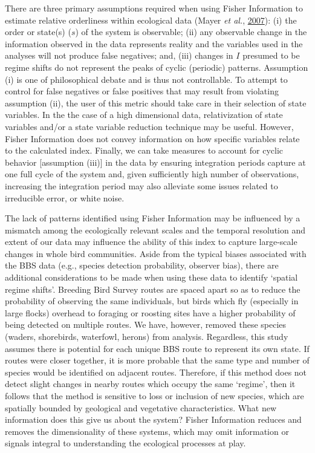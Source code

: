 \documentclass[print]{nuthesis}
\begin{document}
There are three primary assumptions required when using Fisher Information to estimate relative orderliness within ecological data (Mayer \emph{et al.}, \protect\hyperlink{ref-mayer_applications_2007}{2007}): (i) the order or state(s) (\(s\)) of the system is observable; (ii) any observable change in the information observed in the data represents reality and the variables used in the analyses will not produce false negatives; and, (iii) changes in \(I\) presumed to be regime shifts do not represent the peaks of cyclic (periodic) patterns. Assumption (i) is one of philosophical debate and is thus not controllable. To attempt to control for false negatives or false positives that may result from violating assumption (ii), the user of this metric should take care in their selection of state variables. In the the case of a high dimensional data, relativization of state variables and/or a state variable reduction technique may be useful. However, Fisher Information does not convey information on how specific variables relate to the calculated index. Finally, we can take measures to account for cyclic behavior {[}assumption (iii){]} in the data by ensuring integration periods capture at one full cycle of the system and, given sufficiently high number of observations, increasing the integration period may also alleviate some issues related to irreducible error, or white noise.

The lack of patterns identified using Fisher Information may be influenced by a mismatch among the ecologically relevant scales and the temporal resolution and extent of our data may influence the ability of this index to capture large-scale changes in whole bird communities. Aside from the typical biases associated with the BBS data (e.g., species detection probability, observer bias), there are additional considerations to be made when using these data to identify `spatial regime shifts'. Breeding Bird Survey routes are spaced apart so as to reduce the probability of observing the same individuals, but birds which fly (especially in large flocks) overhead to foraging or roosting sites have a higher probability of being detected on multiple routes. We have, however, removed these species (waders, shorebirds, waterfowl, herons) from analysis. Regardless, this study assumes there is potential for each unique BBS route to represent its own state. If routes were closer together, it is more probable that the same type and number of species would be identified on adjacent routes. Therefore, if this method does not detect slight changes in nearby routes which occupy the same `regime', then it follows that the method is sensitive to loss or inclusion of new species, which are spatially bounded by geological and vegetative characteristics. What new information does this give us about the system? Fisher Information reduces and removes the dimensionality of these systems, which may omit information or signals integral to understanding the ecological processes at play.
\end{document}
